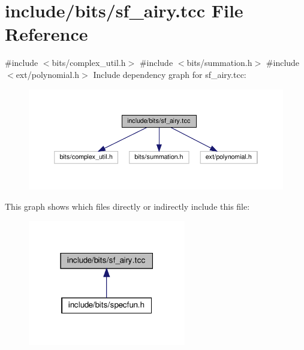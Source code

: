 \hypertarget{sf__airy_8tcc}{}\section{include/bits/sf\+\_\+airy.tcc File Reference}
\label{sf__airy_8tcc}
{\ttfamily \#include $<$bits/complex\+\_\+util.\+h$>$}\newline
{\ttfamily \#include $<$bits/summation.\+h$>$}\newline
{\ttfamily \#include $<$ext/polynomial.\+h$>$}\newline
Include dependency graph for sf\+\_\+airy.\+tcc\+:
\nopagebreak
\begin{figure}[H]
\begin{center}
\leavevmode
\includegraphics[width=350pt]{sf__airy_8tcc__incl}
\end{center}
\end{figure}
This graph shows which files directly or indirectly include this file\+:
\nopagebreak
\begin{figure}[H]
\begin{center}
\leavevmode
\includegraphics[width=195pt]{sf__airy_8tcc__dep__incl}
\end{center}
\end{figure}
